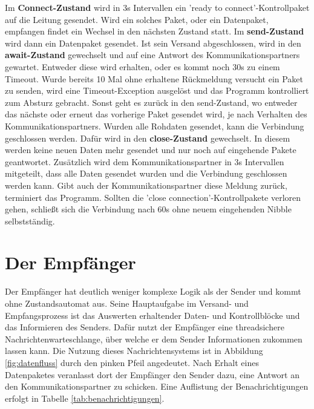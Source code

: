 \noindent
Im \textbf{Connect-Zustand} wird in 3s Intervallen ein 'ready to connect'-Kontrollpaket auf die Leitung gesendet. Wird ein solches Paket, oder ein Datenpaket, empfangen findet ein Wechsel in den nächsten Zustand statt.
Im \textbf{send-Zustand} wird dann ein Datenpaket gesendet. Ist sein Versand abgeschlossen, wird in den \textbf{await-Zustand} gewechselt und auf eine Antwort des Kommunikationspartners gewartet. Entweder diese wird erhalten, oder es kommt noch 30s zu einem Timeout. Wurde bereits 10 Mal ohne erhaltene Rückmeldung versucht ein Paket zu senden, wird eine Timeout-Exception ausgelöst und das Programm kontrolliert zum Absturz gebracht. Sonst geht es zurück in den send-Zustand, wo entweder das nächste oder erneut das vorherige Paket gesendet wird, je nach Verhalten des Kommunikationspartners. Wurden alle Rohdaten gesendet, kann die Verbindung geschlossen werden. Dafür wird in den \textbf{close-Zustand} gewechselt. In diesem werden keine neuen Daten mehr gesendet und nur noch auf eingehende Pakete geantwortet. Zusätzlich wird dem Kommunikationspartner in 3s Intervallen mitgeteilt, dass alle Daten gesendet wurden und die Verbindung geschlossen werden kann. Gibt auch der Kommunikationspartner diese Meldung zurück, terminiert das Programm. Sollten die 'close connection'-Kontrollpakete verloren gehen, schließt sich die Verbindung nach 60s ohne neuem eingehenden Nibble selbstständig.


\section{Der Empfänger}
Der Empfänger hat deutlich weniger komplexe Logik als der Sender und kommt ohne Zustandsautomat aus. Seine Hauptaufgabe im Versand- und Empfangsprozess ist das Auswerten erhaltender Daten- und Kontrollblöcke und das Informieren des Senders. Dafür nutzt der Empfänger eine threadsichere Nachrichtenwarteschlange, über welche er dem Sender Informationen zukommen lassen kann. Die Nutzung dieses Nachrichtensystems ist in Abbildung \ref{fig:datenfluss} durch den pinken Pfeil angedeutet. Nach Erhalt eines Datenpaketes veranlasst dort der Empfänger den Sender dazu, eine Antwort an den Kommunikationspartner zu schicken. Eine Auflistung der Benachrichtigungen erfolgt in Tabelle \ref{tab:benachrichtigungen}.

